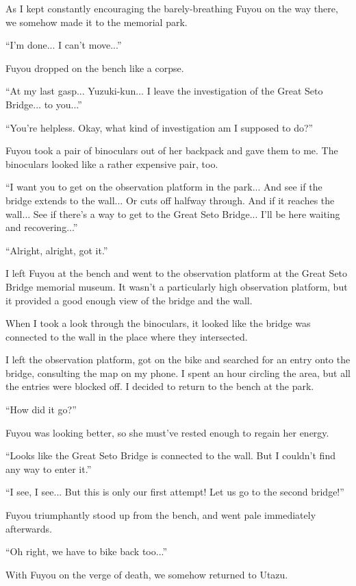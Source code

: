 As I kept constantly encouraging the barely-breathing Fuyou on the way there, we somehow made it to the memorial park.

``I'm done... I can't move...''

Fuyou dropped on the bench like a corpse.

``At my last gasp... Yuzuki-kun... I leave the investigation of the Great Seto Bridge... to you...''

``You're helpless. Okay, what kind of investigation am I supposed to do?''

Fuyou took a pair of binoculars out of her backpack and gave them to me. The binoculars looked like a rather expensive pair, too.

``I want you to get on the observation platform in the park... And see if the bridge extends to the wall... Or cuts off halfway through. And if it reaches the wall... See if there's a way to get to the Great Seto Bridge... I'll be here waiting and recovering...''

``Alright, alright, got it.''

I left Fuyou at the bench and went to the observation platform at the Great Seto Bridge memorial museum. It wasn't a particularly high observation platform, but it provided a good enough view of the bridge and the wall.

When I took a look through the binoculars, it looked like the bridge was connected to the wall in the place where they intersected.

I left the observation platform, got on the bike and searched for an entry onto the bridge, consulting the map on my phone. I spent an hour circling the area, but all the entries were blocked off. I decided to return to the bench at the park.

``How did it go?''

Fuyou was looking better, so she must've rested enough to regain her energy.

``Looks like the Great Seto Bridge is connected to the wall. But I couldn't find any way to enter it.''

``I see, I see... But this is only our first attempt! Let us go to the second bridge!''

Fuyou triumphantly stood up from the bench, and went pale immediately afterwards.

``Oh right, we have to bike back too...''

With Fuyou on the verge of death, we somehow returned to Utazu.

